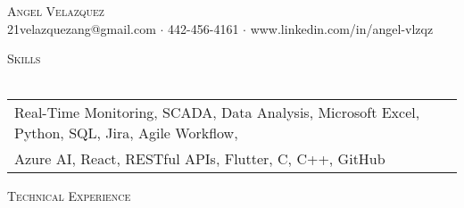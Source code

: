 \documentclass[a4paper]{article}
\newcommand{\lineunder} {
    \vspace*{-8pt} \\
    \hspace*{-18pt} \hrulefill \\
}
\newcommand{\header} [1] {
    {\hspace*{-18pt}\vspace*{6pt} \textsc{#1}}
    \vspace*{-6pt} \lineunder
}
\begin{document}
\vspace*{-40pt}

    

\vspace*{-10pt}
\begin{center}
	{\Huge \scshape {Angel Velazquez}}\\
	21velazquezang@gmail.com $\cdot$ 442-456-4161 $\cdot$ www.linkedin.com/in/angel-vlzqz\\
\end{center}

\header{Skills}
\begin{tabular}{ l l }
    Real-Time Monitoring, SCADA, Data Analysis, Microsoft Excel,
    Python, SQL, Jira, Agile Workflow, \\ Azure AI, React, RESTful APIs, Flutter, C, C++, GitHub \\
\end{tabular}
\vspace{0mm}

\header{Technical Experience}
\vspace{1mm}
\end{document}
